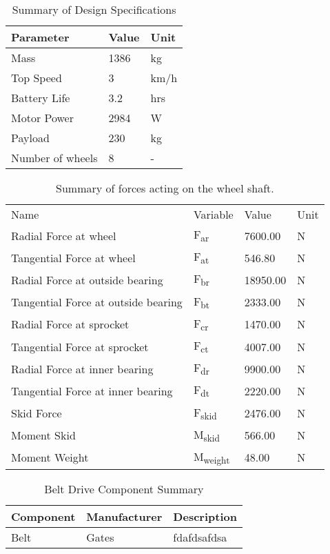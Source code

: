 \begin{table}[htbp]
\centering
\caption{Summary of Design Specifications}
\begin{tabular}{| lll |} \hline
Parameter & Value & Unit \\ \hline
Mass & 1386 & kg \\
Top Speed & 3 & km/h \\
Battery Life & 3.2 & hrs \\
Motor Power & 2984 & W \\
Payload & 230 & kg \\
Number of wheels & 8 & - \\
\end{tabular}
\label{tab:design_spec}
\end{table}


\begin{table}[htbp]
\centering
\caption{Summary of forces acting on the wheel shaft.}
\begin{tabular}{| llll |} \hline
Name & Variable & Value & Unit \\
Radial Force at wheel & F\textsubscript{ar} & 7600.00 & N \\
Tangential Force at wheel & F\textsubscript{at} & 546.80 & N \\
Radial Force at outside bearing & F\textsubscript{br} & 18950.00 & N \\
Tangential Force at outside bearing & F\textsubscript{bt} & 2333.00 & N \\
Radial Force at sprocket & F\textsubscript{cr} & 1470.00 & N \\
Tangential Force at sprocket & F\textsubscript{ct} & 4007.00 & N \\
Radial Force at inner bearing & F\textsubscript{dr} & 9900.00 & N \\
Tangential Force at inner bearing & F\textsubscript{dt} & 2220.00 & N \\
Skid Force & F\textsubscript{skid} & 2476.00 & N \\
Moment Skid & M\textsubscript{skid} & 566.00 & N \\
Moment Weight & M\textsubscript{weight} & 48.00 & N \\
 \end{tabular}
 \label{tab:shaft_calc}
 \end{table}
 
 \begin{table}[htbp]
 \centering
 \caption{Belt Drive Component Summary}
 \begin{tabular}{| lll |} \hline
 Component & Manufacturer & Description \\ \hline
 Belt & Gates & fdafdsafdsa \\
 \end{tabular}
 \label{tab:drive_comp}
 \end{table}
 

